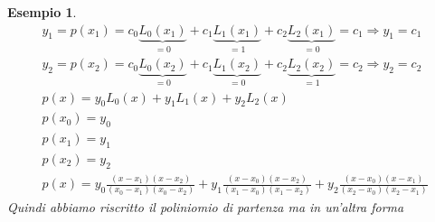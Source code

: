 \documentclass[a4paper, portrait]{book}
\numberwithin{equation}{chapter} %
\newtheorem{example}{Esempio}
\begin{document}
\begin{example}
\begin{gather}
        y_1 = p(x_1) = c_0 \underbrace{L_0(x_1)}_{=0} + c_1\underbrace{L_1(x_1)}_{= 1} + c_2 \underbrace{L_2(x_1)}_{=0} = c_1 \Rightarrow y_1 = c_1\\
        y_2 = p(x_2) = c_0 \underbrace{L_0(x_2)}_{=0} + c_1\underbrace{L_1(x_2)}_{= 0} + c_2 \underbrace{L_2(x_2)}_{=1} = c_2 \Rightarrow y_2 = c_2\\
        p(x) = y_0 L_0 (x) + y_1 L_1 (x) + y_2 L_2 (x)\\
        p(x_0) = y_0\\
        p(x_1) = y_1\\
        p(x_2) = y_2\\
        p(x) = y_0 \frac{(x-x_1)(x-x_2)}{(x_0 - x_1)(x_0 - x_2)}+y_1 \frac{(x- x_0)(x-x_2)}{(x_1 - x_0)(x_1 - x_2)}+ y_2 \frac{(x- x_0)(x-x_1)}{(x_2 - x_0)(x_2 - x_1)}
    \end{gather}
    Quindi abbiamo riscritto il poliniomio di partenza ma in un'altra forma
\end{example}
\end{document}
